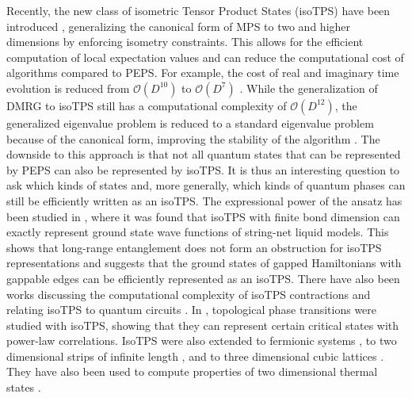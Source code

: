 Recently, the new class of isometric Tensor Product States (isoTPS) have been introduced \cite{cite:isometric_tensor_network_states_in_two_dimensions, cite:conversion_of_PEPS_into_a_canonical_form, cite:DMRG_approach_to_optimizing_2D_tensor_networks}, generalizing the canonical form of MPS to two and higher dimensions by enforcing isometry constraints. This allows for the efficient computation of local expectation values and can reduce the computational cost of algorithms compared to PEPS. For example, the cost of real and imaginary time evolution is reduced from $\mathcal{O}(D^{10})$ to $\mathcal{O}(D^7)$ \cite{cite:isometric_tensor_network_states_in_two_dimensions}. While the generalization of DMRG to isoTPS still has a computational complexity of $\mathcal{O}(D^{12})$, the generalized eigenvalue problem is reduced to a standard eigenvalue problem because of the canonical form, improving the stability of the algorithm \cite{cite:efficient_simulation_of_dynamics_in_two_dimensional_quantum_spin_systems}. The downside to this approach is that not all quantum states that can be represented by PEPS can also be represented by isoTPS. It is thus an interesting question to ask which kinds of states and, more generally, which kinds of quantum phases can still be efficiently written as an isoTPS. The expressional power of the ansatz has been studied in \cite{cite:isometric_tensor_network_representation_of_string_net_liquids}, where it was found that isoTPS with finite bond dimension can exactly represent ground state wave functions of string-net liquid models. This shows that long-range entanglement does not form an obstruction for isoTPS representations and suggests that the ground states of gapped Hamiltonians with gappable edges can be efficiently represented as an isoTPS. There have also been works discussing the computational complexity of isoTPS contractions \cite{cite:computational_complexity_of_isometric_tensor_network_states} and relating isoTPS to quantum circuits \cite{cite:sequential_generation_of_projected_entangled_pair_states, cite:quantum_circuits_for_2D_isometric_tensor_networks}. In \cite{cite:topological_quantum_phase_transitions_in_2D_isometric_tensor_networks}, topological phase transitions were studied with isoTPS, showing that they can represent certain critical states with power-law correlations. IsoTPS were also extended to fermionic systems \cite{cite:fermionic_isometric_tensor_network_states}, to two dimensional strips of infinite length \cite{cite:two_dimensional_isometric_tensor_networks_on_infinite_strip}, and to three dimensional cubic lattices \cite{cite:three_dimensional_isometric_tensor_networks}. They have also been used to compute properties of two dimensional thermal states \cite{cite:isometric_tensor_network_representation_of_2D_thermal_states}. \par
